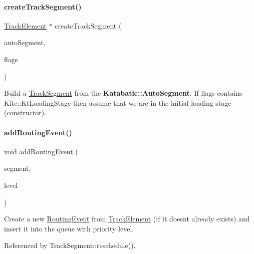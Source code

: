 \paragraph{\texorpdfstring{create\+Track\+Segment()}{createTrackSegment()}}
{\footnotesize\ttfamily \hyperlink{classKite_1_1TrackElement}{Track\+Element} $\ast$ create\+Track\+Segment (\begin{DoxyParamCaption}\item[{\textbf{ Auto\+Segment} $\ast$}]{auto\+Segment,  }\item[{unsigned int}]{flags }\end{DoxyParamCaption})}

Build a \hyperlink{classKite_1_1TrackSegment}{Track\+Segment} from the \textbf{ Katabatic\+::\+Auto\+Segment}. If {\ttfamily flags} contains Kite\+::\+Kt\+Loading\+Stage then assume that we are in the initial loading stage (constructor). \mbox{\label{classKite_1_1NegociateWindow_a51ba8e6a122c0cb93174027658cade63}} 
\paragraph{\texorpdfstring{add\+Routing\+Event()}{addRoutingEvent()}}
{\footnotesize\ttfamily void add\+Routing\+Event (\begin{DoxyParamCaption}\item[{\hyperlink{classKite_1_1TrackElement}{Track\+Element} $\ast$}]{segment,  }\item[{unsigned int}]{level }\end{DoxyParamCaption})}

Create a new \hyperlink{classKite_1_1RoutingEvent}{Routing\+Event} from \hyperlink{classKite_1_1TrackElement}{Track\+Element} (if it doesn\textquotesingle{}t already exists) and insert it into the queue with priority {\ttfamily level}. 

Referenced by Track\+Segment\+::reschedule().

\mbox{\label{classKite_1_1NegociateWindow_acad8f73494d122463d65797d337ce275}} 
